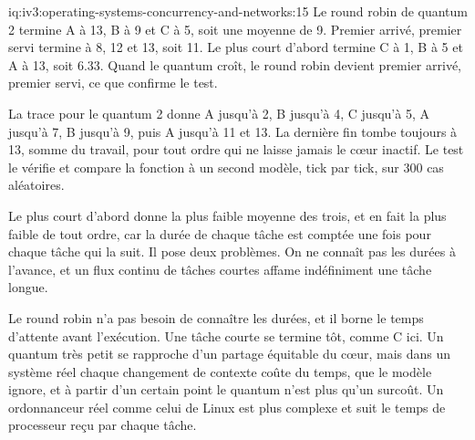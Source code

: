 \begin{solution}{iq:iv3:operating-systems-concurrency-and-networks:15}
Le round robin de quantum 2 termine A à 13, B à 9 et C à 5, soit une moyenne de 9. Premier arrivé, premier servi termine à 8, 12 et 13, soit 11. Le plus court d'abord termine C à 1, B à 5 et A à 13, soit 6.33. Quand le quantum croît, le round robin devient premier arrivé, premier servi, ce que confirme le test.
\label{lst:iv3:os:rr}

La trace pour le quantum 2 donne A jusqu'à 2, B jusqu'à 4, C jusqu'à 5, A jusqu'à 7, B jusqu'à 9, puis A jusqu'à 11 et 13. La dernière fin tombe toujours à 13, somme du travail, pour tout ordre qui ne laisse jamais le cœur inactif. Le test le vérifie et compare la fonction à un second modèle, tick par tick, sur 300 cas aléatoires.

Le plus court d'abord donne la plus faible moyenne des trois, et en fait la plus faible de tout ordre, car la durée de chaque tâche est comptée une fois pour chaque tâche qui la suit. Il pose deux problèmes. On ne connaît pas les durées à l'avance, et un flux continu de tâches courtes affame indéfiniment une tâche longue.

Le round robin n'a pas besoin de connaître les durées, et il borne le temps d'attente avant l'exécution. Une tâche courte se termine tôt, comme C ici. Un quantum très petit se rapproche d'un partage équitable du cœur, mais dans un système réel chaque changement de contexte coûte du temps, que le modèle ignore, et à partir d'un certain point le quantum n'est plus qu'un surcoût. Un ordonnanceur réel comme celui de Linux est plus complexe et suit le temps de processeur reçu par chaque tâche.

\end{solution}

